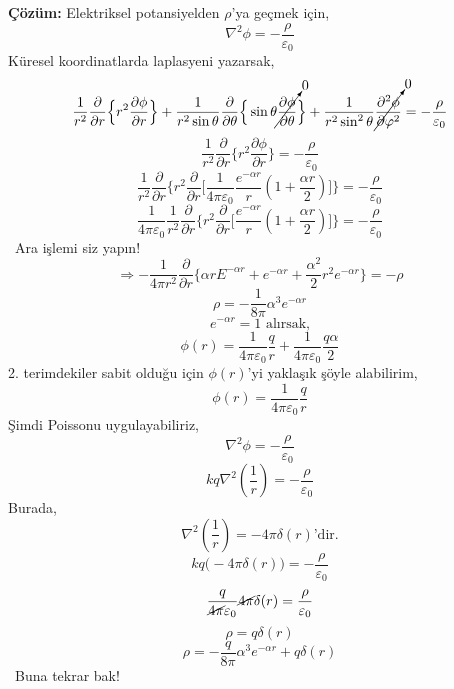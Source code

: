   
\textbf{Çözüm:}
Elektriksel potansiyelden $\rho$'ya geçmek için,
\[ \nabla^{2} \phi = - \dfrac{\rho}{\varepsilon_{0}} \]
Küresel koordinatlarda laplasyeni yazarsak,
\[ \dfrac{1}{r^{2}} \dfrac{\partial }{\partial r} \Big\{ r^{2}   \dfrac{\partial \phi}{\partial r} \Big\} + \dfrac{1}{r^{2} \sin \theta }  \dfrac{\partial}{\partial \theta} \Big\{  \sin \theta \cancelto{0}{\dfrac{\partial \phi}{\partial \theta}} \Big\}  + \dfrac{1}{r^{2} \sin^{2} \theta} \cancelto{0}{\dfrac{\partial^{2} \phi}{\partial \varphi^{2}}} = -  \dfrac{\rho}{\varepsilon_{0}} \]
\[  \dfrac{1}{r^{2}} \dfrac{\partial}{\partial r} \Big\{ r^{2}   \dfrac{\partial \phi}{\partial r} \Big\}  = -  \dfrac{\rho}{\varepsilon_{0}} \]
\[  \dfrac{1}{r^{2}} \dfrac{\partial}{\partial r} \Bigg\{ r^{2}   \dfrac{\partial}{\partial r} \Big[ \dfrac{1}{4 \pi \varepsilon_{0}} \dfrac{e^{- \alpha r}}{r} (1 + \dfrac{\alpha r}{2})\Big] \Bigg\}  = -  \dfrac{\rho}{\varepsilon_{0}} \]
\[ \dfrac{1}{4 \pi \varepsilon_{0}}  \dfrac{1}{r^{2}} \dfrac{\partial}{\partial r} \Bigg\{ r^{2}   \dfrac{\partial}{\partial r} \Big[ \dfrac{e^{- \alpha r}}{r} (1 + \dfrac{\alpha r}{2})\Big] \Bigg\}  = -  \dfrac{\rho}{\varepsilon_{0}} \]
\dangersign \ Ara işlemi siz yapın!
\[ \Rightarrow - \dfrac{1}{4 \pi r^{2}} \dfrac{\partial}{\partial r} \Big\{ \alpha r E^{- \alpha r} + e^{- \alpha r} + \dfrac{\alpha^{2}}{2} r^{2} e^{- \alpha r}  \Big\} = -\rho \]
\[ \rho = - \dfrac{1}{8 \pi} \alpha^{3} e^{- \alpha r}\]
\[ e^{- \alpha r} = 1 \textrm{ alırsak,} \]
\[ \phi (r) = \dfrac{1}{4 \pi \varepsilon_{0}} \dfrac{q}{r} +  \dfrac{1}{4 \pi \varepsilon_{0}} \dfrac{q \alpha}{2} \]
2. terimdekiler sabit olduğu için $\phi (r)$'yi yaklaşık şöyle alabilirim,
\[ \phi(r) = \dfrac{1}{4 \pi \varepsilon_{0}} \dfrac{q}{r} \]
Şimdi Poissonu uygulayabiliriz,
\[ \nabla^{2} \phi = - \dfrac{\rho}{\varepsilon_{0}} \]
\[ kq \nabla^{2} (\dfrac{1}{r}) =  - \dfrac{\rho}{\varepsilon_{0}} \]
Burada,
\[ \nabla^{2} (\dfrac{1}{r}) = - 4 \pi \delta (r) \textrm{'dir.} \]
\[ kq \big(  - 4 \pi \delta(r) \big) = - \dfrac{\rho}{\varepsilon_{0}} \]
\[  \dfrac{q}{\cancel{4 \pi} \varepsilon_{0}}  \cancel{4 \pi} \delta(r) = \dfrac{\rho}{\varepsilon_{0}} \]
\[ \rho = q  \delta(r)\]
\[ \rho = - \dfrac{q}{ 8 \pi} \alpha^{3} e^{- \alpha r} + q \delta (r)\]
\dangersign \ Buna tekrar bak!
\newpage
